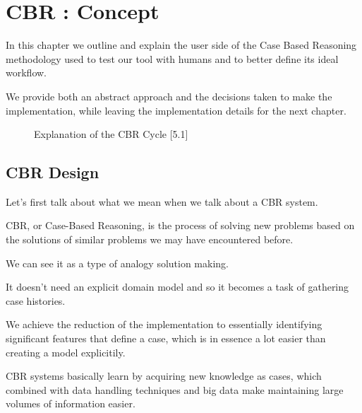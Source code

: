 %
%

\chapter{CBR : Concept}

\begin{resumen}
In this chapter we outline and explain the user side of the Case Based Reasoning methodology used to test our tool with humans and to better define its ideal workflow.

We provide both an abstract approach and the decisions taken to make the implementation, while leaving the implementation details for the next chapter.
\end{resumen}

\linespread{1.6}

\begin{figure}[!htb]
    \caption{\label{fig:my-label} Explanation of the CBR Cycle [5.1]}
\end{figure}

\section{CBR Design}
\label{cap5:sec:introduccion}

Let's first talk about what we mean when we talk about a CBR system.

CBR, or Case-Based Reasoning, is the process of solving new problems based on the solutions of similar problems we may have encountered before.

We can see it as a type of analogy solution making.

It doesn't need an explicit domain model and so it becomes a task of gathering case histories. 

We achieve the reduction of the implementation to essentially identifying significant features that define a case, which is in essence a lot easier than creating a model explicitily. 

CBR systems basically learn by acquiring new knowledge as cases, which combined with data handling techniques and big data make maintaining large volumes of information easier.

